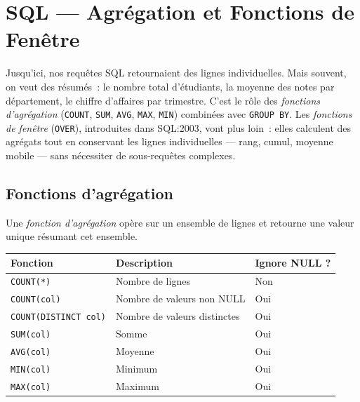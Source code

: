 \chapter{SQL --- Agr\'egation et Fonctions de Fen\^etre}
\label{ch:agregation}

Jusqu'ici, nos requ\^etes SQL retournaient des lignes individuelles. Mais souvent, on veut des r\'esum\'es~: le nombre total d'\'etudiants, la moyenne des notes par d\'epartement, le chiffre d'affaires par trimestre. C'est le r\^ole des \emph{fonctions d'agr\'egation} (\texttt{COUNT}, \texttt{SUM}, \texttt{AVG}, \texttt{MAX}, \texttt{MIN}) combin\'ees avec \texttt{GROUP BY}. Les \emph{fonctions de fen\^etre} (\texttt{OVER}), introduites dans SQL:2003, vont plus loin~: elles calculent des agr\'egats tout en conservant les lignes individuelles --- rang, cumul, moyenne mobile --- sans n\'ecessiter de sous-requ\^etes complexes.

\section{Fonctions d'agr\'egation}

\begin{definition}
Une \emph{fonction d'agr\'egation} op\`ere sur un ensemble de lignes et retourne
une valeur unique r\'esumant cet ensemble.
\end{definition}

\begin{formules}[title=\textbf{Fonctions d'agr\'egation standard}]
\begin{center}
\begin{tabular}{lll}
\toprule
\textbf{Fonction} & \textbf{Description} & \textbf{Ignore NULL ?} \\
\midrule
\texttt{COUNT(*)} & Nombre de lignes & Non \\
\texttt{COUNT(col)} & Nombre de valeurs non NULL & Oui \\
\texttt{COUNT(DISTINCT col)} & Nombre de valeurs distinctes & Oui \\
\texttt{SUM(col)} & Somme & Oui \\
\texttt{AVG(col)} & Moyenne & Oui \\
\texttt{MIN(col)} & Minimum & Oui \\
\texttt{MAX(col)} & Maximum & Oui \\
\bottomrule
\end{tabular}
\end{center}
\end{formules}

